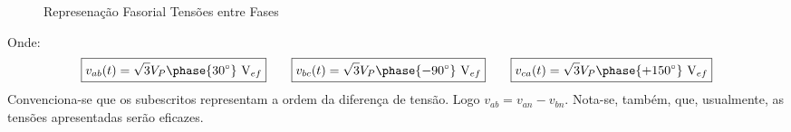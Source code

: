 \documentclass{article}
\begin{document}
\begin{definition}
\begin{figure}[H]
                    \caption{Represenação Fasorial Tensões entre Fases}
                \end{figure}\noindent
            Onde:
                \begin{equation}
                    \boxed{v_{ab}(t) = \sqrt{3}V_{P}\phase{  30^{\circ}}\text{ V}_{ef}}
                    \qquad
                    \boxed{v_{bc}(t) = \sqrt{3}V_{P}\phase{- 90^{\circ}}\text{ V}_{ef}}
                    \qquad
                    \boxed{v_{ca}(t) = \sqrt{3}V_{P}\phase{+150^{\circ}}\text{ V}_{ef}}
                \end{equation}
            Convenciona-se que os subescritos representam a ordem da diferença de tensão. Logo $v_{ab} = v_{an} - v_{bn}$. Nota-se, também, que, usualmente, as tensões apresentadas serão eficazes.
        \end{definition}
\end{document}
